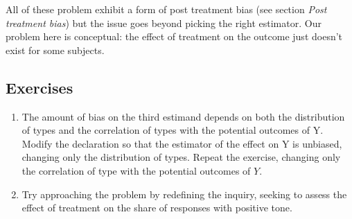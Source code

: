 \documentclass[11pt]{article}\usepackage[]{graphicx}\usepackage[]{color}
\begin{document}
All of these problem exhibit a form of post treatment bias (see section {\it Post treatment bias}) but the issue goes beyond picking the right estimator. Our problem here is conceptual: the effect of treatment on the outcome just doesn't exist for some subjects.


\smallskip \subsection*{Exercises} 

\begin{enumerate}
\item The amount of bias on the third estimand depends on both the distribution of types and the correlation of types with the potential outcomes of Y. Modify the declaration so that the estimator of the effect on Y is unbiased, changing only the distribution of types. Repeat the exercise, changing only the correlation of type with the potential outcomes of $Y$.  
\item Try approaching the problem by redefining the inquiry, seeking to assess the effect of treatment on the share of responses with positive tone. 
\end{enumerate}



\clearpage


\end{document}
